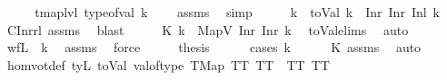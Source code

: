 \begin{isabellebody}
%
\isadelimproof
%
\endisadelimproof
%
\isatagproof
{}\isamarkupfalse%
\ {\isacharminus}{\kern0pt}\isanewline
\ \ \isamarkupfalse%
\ {\isachardoublequoteopen}tmap{\isacharunderscore}{\kern0pt}lvl\ {\isacharparenleft}{\kern0pt}type{\isacharunderscore}{\kern0pt}of{\isacharunderscore}{\kern0pt}val\ k{\isacharparenright}{\kern0pt}\ {\isacharequal}{\kern0pt}\ {}{\isachardoublequoteclose}\ \isamarkupfalse%
\ assms\ \isamarkupfalse%
\ simp\isanewline
\ \ \isamarkupfalse%
\ \isamarkupfalse%
\ k{\isacharprime}{\kern0pt}\ \ {\isachardoublequoteopen}toVal{}{}{}{}\ k\ {\isacharequal}{\kern0pt}\ Inr\ {\isacharparenleft}{\kern0pt}Inr\ {\isacharparenleft}{\kern0pt}Inl\ k{\isacharprime}{\kern0pt}{\isacharparenright}{\kern0pt}{\isacharparenright}{\kern0pt}{\isachardoublequoteclose}\ \isamarkupfalse%
\ C{}Inrrl\ assms\ \isamarkupfalse%
\ blast\isanewline
\ \ \isamarkupfalse%
\ \isamarkupfalse%
\ K{\isacharcolon}{\kern0pt}\ {\isachardoublequoteopen}k\ {\isacharequal}{\kern0pt}\ MapV\ {\isacharparenleft}{\kern0pt}Inr\ {\isacharparenleft}{\kern0pt}Inr\ k{\isacharprime}{\kern0pt}{\isacharparenright}{\kern0pt}{\isacharparenright}{\kern0pt}{\isachardoublequoteclose}\ \isamarkupfalse%
\ toVal{}{}{}{}{\isachardot}{\kern0pt}elims\ \isamarkupfalse%
\ auto\isanewline
\ \ \isamarkupfalse%
\ \isamarkupfalse%
\ {\isachardoublequoteopen}wf{\isacharunderscore}{\kern0pt}L\ {}\ k{\isacharprime}{\kern0pt}{\isachardoublequoteclose}\ \isamarkupfalse%
\ assms\ \isamarkupfalse%
\ force\isanewline
\ \ \isamarkupfalse%
\ \isamarkupfalse%
\ {\isacharquery}{\kern0pt}thesis\isanewline
\ \ \ \ \isamarkupfalse%
\ {\isacharparenleft}{\kern0pt}cases\ k{\isacharprime}{\kern0pt}{\isacharparenright}{\kern0pt}\isanewline
\ \ \ \ \isamarkupfalse%
\ K\ assms{\isacharparenleft}{\kern0pt}{}{\isacharparenright}{\kern0pt}\ \isamarkupfalse%
\ auto\isanewline
{}\isamarkupfalse%
%
\endisatagproof
{\isafoldproof}%
%
\isadelimproof
\isanewline
%
\endisadelimproof
\isanewline
{}\isamarkupfalse%
\ homvotdef{\isacharcolon}{\kern0pt}\ {\isachardoublequoteopen}tyL\ {\isacharparenleft}{\kern0pt}toVal{}\ {\isacharparenleft}{\kern0pt}val{\isacharunderscore}{\kern0pt}of{\isacharunderscore}{\kern0pt}type\ {\isacharparenleft}{\kern0pt}TMap\ TT\ TT{\isacharparenright}{\kern0pt}{\isacharparenright}{\kern0pt}{\isacharparenright}{\kern0pt}\ {\isacharequal}{\kern0pt}\ {\isacharparenleft}{\kern0pt}TT{\isacharcomma}{\kern0pt}\ TT{\isacharparenright}{\kern0pt}{\isachardoublequoteclose}%

\end{isabellebody}
